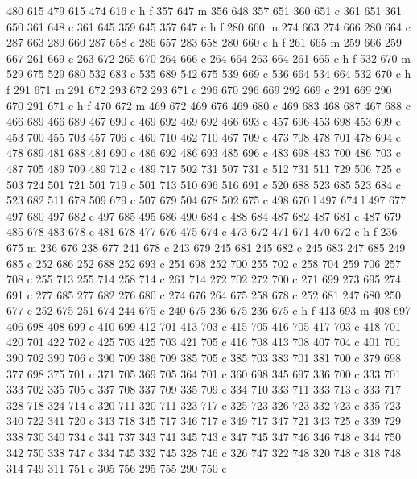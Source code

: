 {{   480 615 479 615 474 616 c
   h f
   357 647 m
   356 648 357 651 360 651 c
   361 651 361 650 361 648 c
   361 645 359 645 357 647 c
   h f
   280 660 m
   274 663 274 666 280 664 c
   287 663 289 660 287 658 c
   286 657 283 658 280 660 c
   h f
   261 665 m
   259 666 259 667 261 669 c
   263 672 265 670 264 666 c
   264 664 263 664 261 665 c
   h f
   532 670 m
   529 675 529 680 532 683 c
   535 689 542 675 539 669 c
   536 664 534 664 532 670 c
   h f
   291 671 m
   291 672 293 672 293 671 c
   296 670 296 669 292 669 c
   291 669 290 670 291 671 c
   h f
   470 672 m
   469 672 469 676 469 680 c
   469 683 468 687 467 688 c
   466 689 466 689 467 690 c
   469 692 469 692 466 693 c
   457 696 453 698 453 699 c
   453 700 455 703 457 706 c
   460 710 462 710 467 709 c
   473 708 478 701 478 694 c
   478 689 481 688 484 690 c
   486 692 486 693 485 696 c
   483 698 483 700 486 703 c
   487 705 489 709 489 712 c
   489 717 502 731 507 731 c
   512 731 511 729 506 725 c
   503 724 501 721 501 719 c
   501 713 510 696 516 691 c
   520 688 523 685 523 684 c
   523 682 511 678 509 679 c
   507 679 504 678 502 675 c
   498 670 l
   497 674 l
   497 677 497 680 497 682 c
   497 685 495 686 490 684 c
   488 684 487 682 487 681 c
   487 679 485 678 483 678 c
   481 678 477 676 475 674 c
   473 672 471 671 470 672 c
   h f
   236 675 m
   236 676 238 677 241 678 c
   243 679 245 681 245 682 c
   245 683 247 685 249 685 c
   252 686 252 688 252 693 c
   251 698 252 700 255 702 c
   258 704 259 706 257 708 c
   255 713 255 714 258 714 c
   261 714 272 702 272 700 c
   271 699 273 695 274 691 c
   277 685 277 682 276 680 c
   274 676 264 675 258 678 c
   252 681 247 680 250 677 c
   252 675 251 674 244 675 c
   240 675 236 675 236 675 c
   h f
   413 693 m
   408 697 406 698 408 699 c
   410 699 412 701 413 703 c
   415 705 416 705 417 703 c
   418 701 420 701 422 702 c
   425 703 425 703 421 705 c
   416 708 413 708 407 704 c
   401 701 390 702 390 706 c
   390 709 386 709 385 705 c
   385 703 383 701 381 700 c
   379 698 377 698 375 701 c
   371 705 369 705 364 701 c
   360 698 345 697 336 700 c
   333 701 333 702 335 705 c
   337 708 337 709 335 709 c
   334 710 333 711 333 713 c
   333 717 328 718 324 714 c
   320 711 320 711 323 717 c
   325 723 326 723 332 723 c
   335 723 340 722 341 720 c
   343 718 345 717 346 717 c
   349 717 347 721 343 725 c
   339 729 338 730 340 734 c
   341 737 343 741 345 743 c
   347 745 347 746 346 748 c
   344 750 342 750 338 747 c
   334 745 332 745 328 746 c
   326 747 322 748 320 748 c
   318 748 314 749 311 751 c
   305 756 295 755 290 750 c
}}
